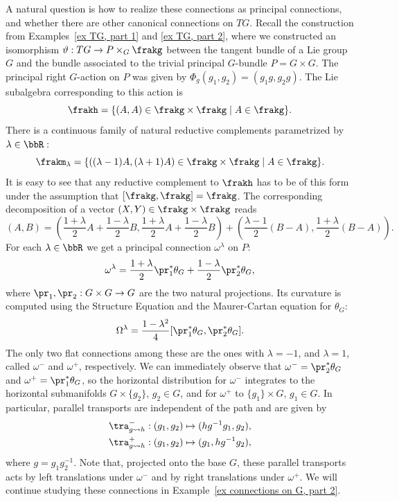\begin{example}
    A natural question is how to realize these connections as principal connections, and whether there are other canonical connections on $TG$. Recall the construction from Examples~\ref{ex TG, part 1} and \ref{ex TG, part 2}, where we constructed an isomorphism $\vartheta:TG\to P\times_G \frakg$ between the tangent bundle of a Lie group $G$ and the bundle associated to the trivial principal $G$-bundle $P=G\times G$. The principal right $G$-action on $P$ was given by $\Phi_g(g_1,g_2)=(g_1g,g_2g)$. The Lie subalgebra corresponding to this action is
    \[\frakh=\{(A,A)\in \frakg\times\frakg\mid A\in\frakg\}.\]
    There is a continuous family of natural reductive complements parametrized by $\lambda\in\bbR:$
    \[\frakm_\lambda=\{((\lambda-1)A,(\lambda+1)A)\in \frakg\times\frakg\mid A\in\frakg\}.\] 
    It is easy to see that any reductive complement to $\frakh$ has to be of this form under the assumption that $[\frakg,\frakg]=\frakg$. The corresponding decomposition of a vector $(X,Y)\in\frakg\times\frakg$ reads
    \[(A,B)=\left(\frac{1+\lambda}{2}A+\frac{1-\lambda}{2}B,\frac{1+\lambda}{2}A+\frac{1-\lambda}{2}B\right)+\left(\frac{\lambda-1}{2}(B-A),\frac{1+\lambda}{2}(B-A)\right).\]
    For each $\lambda\in\bbR$ we get a principal connection $\omega^\lambda$ on $P$:
    \[\omega^\lambda=\frac{1+\lambda}{2}\pr_1^\ast \theta_G+\frac{1-\lambda}{2}\pr_2^\ast \theta_G,\]
    where $\pr_1,\pr_2:G\times G\to G$ are the two natural projections. Its curvature is computed using the Structure Equation and the Maurer-Cartan equation for $\theta_G$:
    \[\Omega^\lambda=\frac{1-\lambda^2}{4}[\pr_1^\ast \theta_G,\pr_2^\ast\theta_G].\]
    The only two flat connections among these are the ones with $\lambda=-1$, and $\lambda=1$, called $\omega^-$ and $\omega^+$, respectively. We can immediately observe that $\omega^-=\pr_2^\ast\theta_G$ and $\omega^+=\pr_1^\ast\theta_G$, so the horizontal distribution for $\omega^-$ integrates to the horizontal submanifolds $G\times\{g_2\}$, $g_2\in G$, and for $\omega^+$ to $\{g_1\}\times G$, $g_1\in G$. In particular, parallel transports are independent of the path and are given by
    \begin{align}
        \tra^-_{g\leadsto h}: (g_1,g_2)\mapsto (hg^{-1}g_1,g_2),\\
        \tra^+_{g\leadsto h}: (g_1,g_2)\mapsto (g_1,hg^{-1}g_2),
    \end{align}
    where $g=g_1g_2^{-1}$. Note that, projected onto the base $G$, these parallel transports acts by left translations under $\omega^-$ and by right translations under $\omega^+$.
    We will continue studying these connections in Example~\ref{ex connections on G, part 2}.
\end{example}









